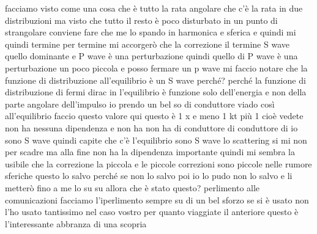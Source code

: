 facciamo visto come una cosa che è tutto la rata angolare che c'è la rata in due distribuzioni ma visto che tutto il resto è poco disturbato in un punto di strangolare conviene fare che me lo spando in harmonica e sferica e quindi mi quindi termine per termine mi accorgerò che la correzione il termine S wave quello dominante e P wave è una perturbazione quindi quello di P wave è una perturbazione un poco piccola e posso fermare un p wave mi faccio notare che la funzione di distribuzione all'equilibrio è un S wave perché? perché la funzione di distribuzione di fermi dirac in l'equilibrio è funzione solo dell'energia e non della parte angolare dell'impulso io prendo un bel so di conduttore viado così all'equilibrio faccio questo valore qui questo è 1 x e meno 1 kt più 1 cioè vedete non ha nessuna dipendenza e non ha non ha di conduttore di conduttore di io sono S wave quindi capite che c'è l'equilibrio sono S wave lo scattering si mi non per scadre ma alla fine non ha la dipendenza importante quindi mi sembra la usibile che la correzione la piccola e le piccole correzioni sono piccole nelle rumore sferiche questo lo salvo perché se non lo salvo poi io lo pudo non lo salvo e li metterò fino a me lo su su allora che è stato questo? perlimento alle comunicazioni facciamo l'iperlimento sempre su di un bel sforzo se si è usato non l'ho usato tantissimo nel caso vostro per quanto viaggiate il anteriore questo è l'interessante abbranza di una scopria